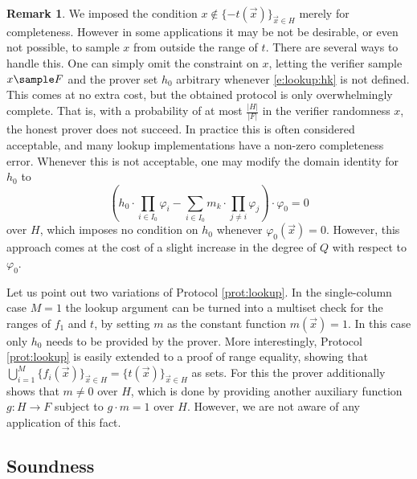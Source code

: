 \documentclass[11pt]{article}
\theoremstyle{definition}
\theoremstyle{definition}
\newtheorem{rem}[thm]{Remark}
\begin{document}
\begin{rem}
\label{rem:lookup:completeness}
We imposed the condition $x\notin \{- t(\vec x)\}_{\vec x \in H}$ merely for completeness. 
However in some applications it may be not be desirable, or even not possible, to sample $x$ from outside the range of $t$.
There are several ways to handle this.
One can simply omit the constraint on $x$, letting the verifier sample $x\sample F$ and the prover set $h_0$ arbitrary whenever \eqref{e:lookup:hk} is not defined.
This comes at no extra cost, but the obtained protocol is only overwhelmingly complete. 
That is, with a probability of at most $\frac{|H|}{|F|}$ in the verifier randomness $x$, the honest prover does not succeed.
In practice this is often considered acceptable, and many lookup implementations have a non-zero completeness error. 
Whenever this is not acceptable, one may modify the domain identity for $h_0$ to 
\begin{equation}
\label{e:lookup:h:identity:complete}
\left(h_0 \cdot \prod_{i\in I_0}\varphi_i - \sum_{i \in I_0} m_k\cdot \prod_{j\neq i} \varphi_j\right)\cdot   \varphi_0  = 0
\end{equation}
over $H$, which imposes no condition on $h_0$ whenever $\varphi_0(\vec x)= 0$. 
However, this approach comes at the cost of a slight increase  in the degree of $Q$ with respect to $\varphi_0$.
\end{rem}

Let us point out two variations of Protocol \ref{prot:lookup}.
In the single-column case $M=1$ the lookup argument can be turned into a multiset check for the ranges of $f_1$ and $t$, by setting $m$ as the constant function $m(\vec x) = 1$.
In this case only $h_0$ needs to be provided by the prover.
More interestingly, Protocol \ref{prot:lookup} is easily extended to a proof of range equality, showing that $\bigcup_{i=1}^M \{f_i(\vec x)\}_{\vec x\in H} = \{ t(\vec x)\}_{\vec x\in H}$ as sets.
For this the prover additionally shows that $m \neq 0$ over $H$, which is done by providing another auxiliary function $g: H\rightarrow F$ subject to $g\cdot m = 1$ over $H$.
However, we are not aware of any application of this fact.





\subsection{Soundness}
\label{s:lookup:soundness}
\end{document}
